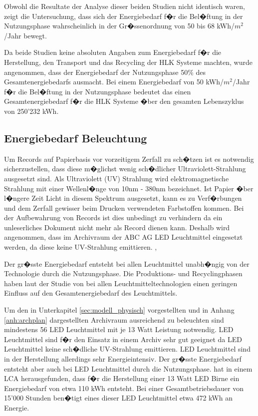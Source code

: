 \documentclass[a4paper,twoside,10pt]{report}
\begin{document}
Obwohl die Resultate der Analyse dieser beiden Studien nicht identisch waren, zeigt die Untersuchung, dass sich der Energiebedarf f�r die Bel�ftung in der Nutzungsphase wahrscheinlich in der Gr�ssenordnung von 50 bis 68 kWh/$m^2$/Jahr bewegt.

Da beide Studien keine absoluten Angaben zum Energiebedarf f�r die Herstellung, den Transport und das Recycling der \ac{HLK} Systeme machten, wurde angenommen, dass der Energiebedarf der Nutzungsphase 50\% des Gesamtenergiebedarfs ausmacht. Bei einem Energiebedarf von 50 kWh/$m^2$/Jahr f�r die Bel�ftung in der Nutzungsphase bedeutet das einen Gesamtenergiebedarf f�r die \ac{HLK} Systeme �ber den gesamten Lebenszyklus von 250'232 kWh. 

\subsection{Energiebedarf Beleuchtung}\label{subsec:licht}
Um Records auf Papierbasis vor vorzeitigem Zerfall zu sch�tzen ist es notwendig sicherzustellen, dass diese m�glichst wenig sch�dlicher Ultraviolett-Strahlung ausgesetzt sind. Als Ultraviolett (UV) Strahlung wird elektromagnetische Strahlung mit einer Wellenl�nge von 10nm - 380nm bezeichnet. Ist Papier �ber l�ngere Zeit Licht in diesem Spektrum ausgesetzt, kann es zu Verf�rbungen und dem Zerfall gewisser beim Drucken verwendeten Farbstoffen kommen. Bei der Aufbewahrung von Records ist dies unbedingt zu verhindern da ein unleserliches Dokument nicht mehr als Record dienen kann. Deshalb wird angenommen, dass im Archivraum der ABC AG LED Leuchtmittel eingesetzt werden, da diese keine UV-Strahlung emittieren. \cite{luzarchv}, \cite{led_uv}

Der gr�sste Energiebedarf entsteht bei allen Leuchtmittel unabh�ngig von der Technologie durch die Nutzungsphase. Die Produktions- und Recyclingphasen haben laut der Studie von \citeauthor{lca_licht} bei allen Leuchtmitteltechnologien einen geringen Einfluss auf den Gesamtenergiebedarf des Leuchtmittels. \cite{lca_licht}

Um den in Unterkapitel \ref{sec:modell_physisch} vorgestellten und in Anhang \ref{anh:archplan} dargestellten Archivraum ausreichend zu beleuchten sind mindestens 56 LED Leuchtmittel mit je 13 Watt Leistung notwendig. LED Leuchtmittel sind f�r den Einsatz in einem Archiv sehr gut geeignet da LED Leuchtmittel keine sch�dliche UV-Strahlung emittieren. LED Leuchtmittel sind in der Herstellung allerdings sehr Energieintensiv. Der gr�sste Energiebedarf entsteht aber auch bei LED Leuchtmittel durch die Nutzungsphase. \citeauthor{lca_licht} hat in einem \acf{LCA} herausgefunden, dass f�r die Herstellung einer 13 Watt LED Birne ein Energiebedarf von etwa 110 kWh entsteht. Bei einer Gesamtbetriebsdauer von 15'000 Stunden ben�tigt eines dieser LED Leuchtmittel etwa 472 kWh an Energie. \cite{lca_licht}
\end{document}

